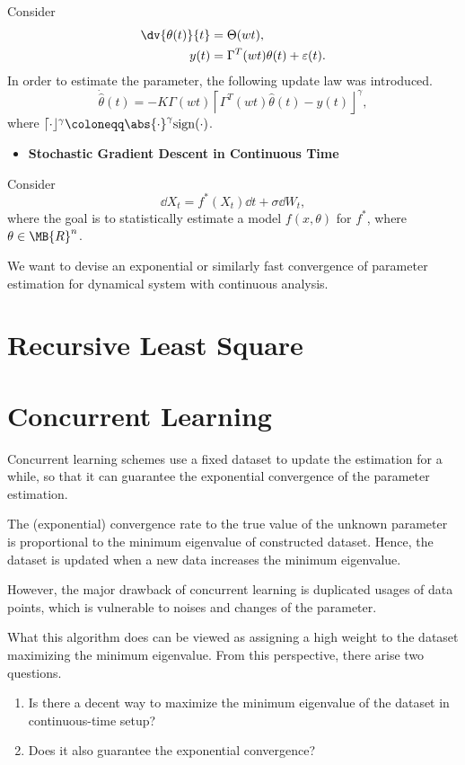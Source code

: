 \documentclass[nobib]{my-handout}
\begin{document}
Consider \[
\begin{aligned}
    \dv{\theta(t)}{t} &= \Theta(wt), \\
    y(t) &= \Gamma^T(wt) \theta(t) + \varepsilon(t).
\end{aligned}
\] In order to estimate the parameter, the following update law was
introduced. \[
\dot{\hat{\theta}}(t) = - K \Gamma(wt) \left\lceil \Gamma^T(wt) \hat{\theta}(t)
- y(t) \right\rfloor^\gamma,
\] where
\(\lceil \cdot \rfloor^\gamma \coloneqq \abs{\cdot}^\gamma \mathrm{sign}(\cdot)\).

\begin{itemize}
\item
	\textbf{Stochastic Gradient Descent in Continuous
	Time}\cite{sirignano_stochastic_2017}
\end{itemize}

Consider \[
\dd{X_t} = f^\ast (X_t) \dd{t} + \sigma \dd{W_t},
\] where the goal is to statistically estimate a model \(f(x, \theta)\)
for \(f^\ast\), where \(\theta \in \MB{R}^n\).


\begin{shade}[Note]
	We want to devise an exponential or similarly fast convergence of parameter
	estimation for dynamical system with continuous analysis.
\end{shade}


\section{Recursive Least Square}


\section{Concurrent Learning}

Concurrent learning schemes use a fixed dataset to update the estimation for a
while, so that it can guarantee the exponential convergence of the parameter
estimation.

The (exponential) convergence rate to the true value of the unknown parameter
is proportional to the minimum eigenvalue of constructed dataset.  Hence, the
dataset is updated when a new data increases the minimum eigenvalue.

However, the major drawback of concurrent learning is duplicated usages of data
points, which is vulnerable to noises and changes of the parameter.

What this algorithm does can be viewed as assigning a high weight to the
dataset maximizing the minimum eigenvalue. From this perspective, there arise
two questions.
\begin{enumerate}
	\item Is there a decent way to maximize the minimum eigenvalue of the dataset
		in continuous-time setup?
	\item Does it also guarantee the exponential convergence?
\end{enumerate}
\end{document}
